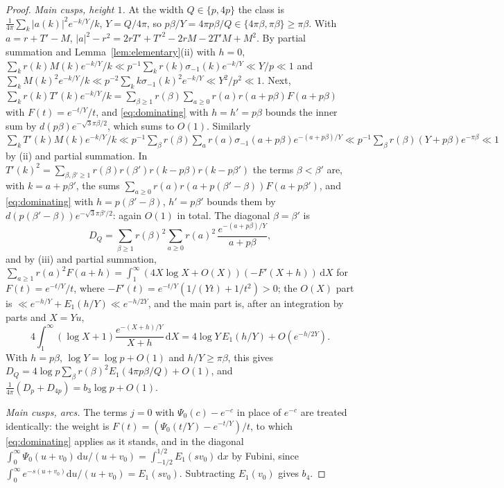 \documentclass[11pt]{amsart}
\theoremstyle{remark}
\newcommand{\dd}{\mathrm{d}}
\begin{document}
\begin{proof}
\emph{Main cusps, height $1$.} At the width $Q\in\{p,4p\}$ the class is $\frac1{4\pi}\sum_k|a(k)|^2e^{-k/Y}/k$, $Y=Q/4\pi$, so $p\beta/Y=4\pi p\beta/Q\in\{4\pi\beta,\pi\beta\}\ge\pi\beta$. With $a=r+T'-M$, $|a|^2-r^2=2rT'+T'^2-2rM-2T'M+M^2$. By partial summation and Lemma~\ref{lem:elementary}(ii) with $h=0$, $\sum_kr(k)M(k)e^{-k/Y}/k\ll p^{-1}\sum_kr(k)\sigma_{-1}(k)e^{-k/Y}\ll Y/p\ll1$ and $\sum_kM(k)^2e^{-k/Y}/k\ll p^{-2}\sum_kk\sigma_{-1}(k)^2e^{-k/Y}\ll Y^2/p^2\ll1$. Next, $\sum_kr(k)T'(k)e^{-k/Y}/k=\sum_{\beta\ge1}r(\beta)\sum_{a\ge0}r(a)r(a+p\beta)F(a+p\beta)$ with $F(t)=e^{-t/Y}/t$, and \eqref{eq:dominating} with $h=h'=p\beta$ bounds the inner sum by $d(p\beta)e^{-\sqrt3\pi\beta/2}$, which sums to $O(1)$. Similarly $\sum_kT'(k)M(k)e^{-k/Y}/k\ll p^{-1}\sum_\beta r(\beta)\sum_ar(a)\sigma_{-1}(a+p\beta)e^{-(a+p\beta)/Y}\ll p^{-1}\sum_\beta r(\beta)(Y+p\beta)e^{-\pi\beta}\ll1$ by (ii) and partial summation. In $T'(k)^2=\sum_{\beta,\beta'\ge1}r(\beta)r(\beta')r(k-p\beta)r(k-p\beta')$ the terms $\beta<\beta'$ are, with $k=a+p\beta'$, the sums $\sum_{a\ge0}r(a)r(a+p(\beta'-\beta))F(a+p\beta')$, and \eqref{eq:dominating} with $h=p(\beta'-\beta)$, $h'=p\beta'$ bounds them by $d(p(\beta'-\beta))e^{-\sqrt3\pi\beta'/2}$: again $O(1)$ in total. The diagonal $\beta=\beta'$ is
\[
D_Q=\sum_{\beta\ge1}r(\beta)^2\sum_{a\ge0}r(a)^2\,\frac{e^{-(a+p\beta)/Y}}{a+p\beta},
\]
and by (iii) and partial summation, $\sum_{a\ge1}r(a)^2F(a+h)=\int_1^\infty(4X\log X+O(X))(-F'(X+h))\,\dd X$ for $F(t)=e^{-t/Y}/t$, where $-F'(t)=e^{-t/Y}(1/(Yt)+1/t^2)>0$; the $O(X)$ part is $\ll e^{-h/Y}+E_1(h/Y)\ll e^{-h/2Y}$, and the main part is, after an integration by parts and $X=Yu$,
\[
4\int_1^\infty(\log X+1)\frac{e^{-(X+h)/Y}}{X+h}\,\dd X=4\log Y\,E_1(h/Y)+O(e^{-h/2Y}).
\]
With $h=p\beta$, $\log Y=\log p+O(1)$ and $h/Y\ge\pi\beta$, this gives $D_Q=4\log p\sum_\beta r(\beta)^2E_1(4\pi p\beta/Q)+O(1)$, and $\frac1{4\pi}(D_p+D_{4p})=b_3\log p+O(1)$.

\emph{Main cusps, arcs.} The terms $j=0$ with $\Psi_0(c)-e^{-c}$ in place of $e^{-c}$ are treated identically: the weight is $F(t)=(\Psi_0(t/Y)-e^{-t/Y})/t$, to which \eqref{eq:dominating} applies as it stands, and in the diagonal $\int_0^\infty\Psi_0(u+v_0)\,\dd u/(u+v_0)=\int_{-1/2}^{1/2}E_1(sv_0)\,\dd x$ by Fubini, since $\int_0^\infty e^{-s(u+v_0)}\dd u/(u+v_0)=E_1(sv_0)$. Subtracting $E_1(v_0)$ gives $b_4$.


\end{proof}
\end{document}
